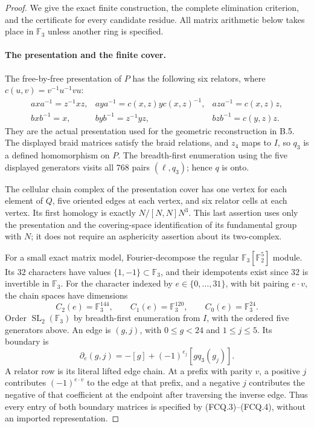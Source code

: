\begin{proof}
We give the exact finite construction, the complete elimination
criterion, and the certificate for every candidate residue.  All
matrix arithmetic below takes place in $\mathbb F_3$ unless another
ring is specified.

\paragraph{The presentation and the finite cover.}
The free-by-free presentation of $P$ has the following six relators,
where $c(u,v)=v^{-1}u^{-1}vu$:
\[
\begin{array}{lll}
 axa^{-1}=z^{-1}xz,&
 aya^{-1}=c(x,z)y c(x,z)^{-1},&
 aza^{-1}=c(x,z)z,\\
 bxb^{-1}=x,&
 byb^{-1}=z^{-1}yz,&
 bzb^{-1}=c(y,z)z.
\end{array}                                                     \tag{FCQ.3}
\]
They are the actual presentation used for the geometric reconstruction
in B.5.  The displayed braid matrices satisfy the braid relations,
and $z_4$ maps to $I$, so $q_3$ is a defined homomorphism on $P$.
The breadth-first enumeration using the five displayed generators
visits all $768$ pairs $(\ell,q_3)$; hence $q$ is onto.

The cellular chain complex of the presentation cover has one vertex
for each element of $Q$, five oriented edges at each vertex, and six
relator cells at each vertex.  Its first homology is exactly
$N/[N,N]N^3$.  This last assertion uses only the presentation and the
covering-space identification of its fundamental group with $N$;
it does not require an asphericity assertion about its two-complex.

For a small exact matrix model, Fourier-decompose the regular
$\mathbb F_3[\mathbb F_2^5]$ module.  Its $32$ characters have values
$\{1,-1\}\subset\mathbb F_3$, and their idempotents exist since
$32$ is invertible in $\mathbb F_3$.  For the character indexed by
$e\in\{0,\ldots,31\}$, with bit pairing $e\cdot v$, the chain
spaces have dimensions
\[
 C_2(e)=\mathbb F_3^{144},\qquad
 C_1(e)=\mathbb F_3^{120},\qquad
 C_0(e)=\mathbb F_3^{24}.
\]
Order $\operatorname{SL}_2(\mathbb F_3)$ by breadth-first enumeration
from $I$, with the ordered five generators above.  An edge is $(g,j)$,
with $0\leq g<24$ and $1\leq j\leq5$.  Its boundary is
\[
 \partial_e(g,j)=-[g]+(-1)^{e_j}[gq_3(g_j)].       \tag{FCQ.4}
\]
A relator row is its literal lifted edge chain.  At a prefix with
parity $v$, a positive $j$ contributes $(-1)^{e\cdot v}$ to the
edge at that prefix, and a negative $j$ contributes the negative
of that coefficient at the endpoint after traversing the inverse
edge.  Thus every entry of both boundary matrices is specified by
\textup{(FCQ.3)--(FCQ.4)}, without an imported representation.


\end{proof}
